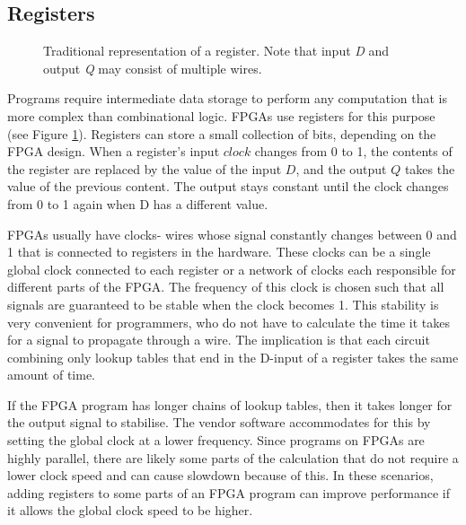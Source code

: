 \subsection{Registers}
\begin{figure}
\centering
{}
\caption{Traditional representation of a register. Note that input \textit{D} and output \textit{Q} may consist of multiple wires.}
\label{fig:register}
\end{figure}

Programs require intermediate data storage to perform any computation that is more complex than combinational logic. FPGAs use registers for this purpose (see Figure \ref{fig:register}). Registers can store a small collection of bits, depending on the FPGA design. When a register's input $clock$ changes from 0 to 1, the contents of the register are replaced by the value of the input $D$, and the output $Q$ takes the value of the previous content. The output stays constant until the clock changes from 0 to 1 again when D has a different value.

FPGAs usually have clocks- wires whose signal constantly changes between 0 and 1 that is connected to registers in the hardware. These clocks can be a single global clock connected to each register or a network of clocks each responsible for different parts of the FPGA. The frequency of this clock is chosen such that all signals are guaranteed to be stable when the clock becomes 1. This stability is very convenient for programmers, who do not have to calculate the time it takes for a signal to propagate through a wire. The implication is that each circuit combining only lookup tables that end in the D-input of a register takes the same amount of time.

If the FPGA program has longer chains of lookup tables, then it takes longer for the output signal to stabilise. The vendor software accommodates for this by setting the global clock at a lower frequency. Since programs on FPGAs are highly parallel, there are likely some parts of the calculation that do not require a lower clock speed and can cause slowdown because of this. In these scenarios, adding registers to some parts of an FPGA program can improve performance if it allows the global clock speed to be higher.


